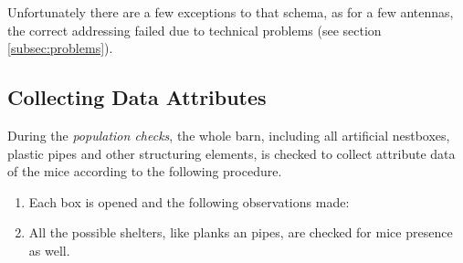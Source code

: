 Unfortunately there are a few exceptions to that schema, as for a few antennas, the correct addressing failed due to technical problems (see section \ref{subsec:problems}).

% 

\subsection{Collecting Data Attributes}
\label{subsec:dataattr}

During the \textit{population checks}, the whole barn, including all artificial nestboxes, plastic pipes and other structuring elements, is checked to collect attribute data of the mice according to the following procedure.

\begin{enumerate} 
	\item Each box is opened and the following observations made:
	\item All the possible shelters, like planks an pipes, are checked for mice presence as well.
\end{enumerate}

